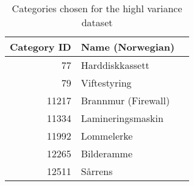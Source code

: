 \begin{table}[h]
\centering
\caption{Categories chosen for the highl variance dataset}
\label{table:dataset-high_variance_categories}
\begin{tabular}{rll}
\toprule
 Category ID &    Name (Norwegian) \\
\midrule
          77 &     Harddiskkassett \\
          79 &        Viftestyring \\
       11217 & Brannmur (Firewall) \\
       11334 &   Lamineringsmaskin \\
       11992 &          Lommelerke \\
       12265 &          Bilderamme \\
       12511 &             Sårrens \\
\bottomrule
\end{tabular}
\end{table}
